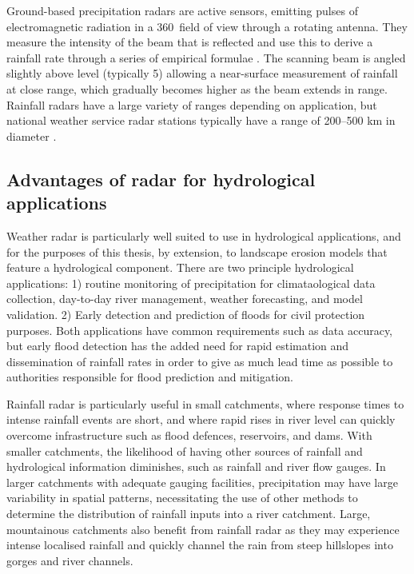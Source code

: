 Ground-based precipitation radars are active sensors, emitting pulses of electromagnetic radiation in a 360\degree \ field of view through a rotating antenna. They measure the intensity of the beam that is reflected and use this to derive a rainfall rate through a series of empirical formulae \citep{wilson1979radar}. The scanning beam is angled slightly above level (typically 5\degree) allowing a near-surface measurement of rainfall at close range, which gradually becomes higher as the beam extends in range.  Rainfall radars have a large variety of ranges depending on application, but national weather service radar stations typically have a range of 200--500 km in diameter \citep{fabry2015radar}.  

\subsection{Advantages of radar for hydrological applications}
Weather radar is particularly well suited to use in hydrological applications, and for the purposes of this thesis, by extension, to landscape erosion models that feature a hydrological component. There are two principle hydrological applications: 1) routine monitoring of precipitation for climataological data collection, day-to-day river management, weather forecasting, and model validation. 2) Early detection and prediction of floods for civil protection purposes. Both applications have common requirements such as data accuracy, but early flood detection has the added need for rapid estimation and dissemination of rainfall rates in order to give as much lead time as possible to authorities responsible for flood prediction and mitigation. 

Rainfall radar is particularly useful in small catchments, where response times to intense rainfall events are short, and where rapid rises in river level can quickly overcome infrastructure such as flood defences, reservoirs, and dams. With smaller catchments, the likelihood of having other sources of rainfall and hydrological information diminishes, such as rainfall and river flow gauges. In larger catchments with adequate gauging facilities, precipitation may have large variability in spatial patterns, necessitating the use of other methods to determine the distribution of rainfall inputs into a river catchment. Large, mountainous catchments also benefit from rainfall radar as they may experience intense localised rainfall and quickly channel the rain from steep hillslopes into gorges and river channels.



